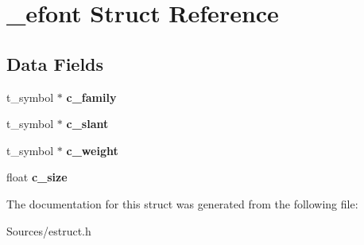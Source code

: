 \hypertarget{struct__efont}{\section{\-\_\-efont Struct Reference}
\label{struct__efont}
}
\subsection*{Data Fields}
\begin{DoxyCompactItemize}
\item 
\hypertarget{struct__efont_ad0a12c28988a03d63f0a63ae52545b7e}{t\-\_\-symbol $\ast$ {\bfseries c\-\_\-family}}\label{struct__efont_ad0a12c28988a03d63f0a63ae52545b7e}

\item 
\hypertarget{struct__efont_afe59dcb9bf09d16691d63350aba4e22f}{t\-\_\-symbol $\ast$ {\bfseries c\-\_\-slant}}\label{struct__efont_afe59dcb9bf09d16691d63350aba4e22f}

\item 
\hypertarget{struct__efont_a1e65976e3fc680a945be671bbcada87c}{t\-\_\-symbol $\ast$ {\bfseries c\-\_\-weight}}\label{struct__efont_a1e65976e3fc680a945be671bbcada87c}

\item 
\hypertarget{struct__efont_a0c2e0d8b2b562976f466b37e1804e896}{float {\bfseries c\-\_\-size}}\label{struct__efont_a0c2e0d8b2b562976f466b37e1804e896}

\end{DoxyCompactItemize}


The documentation for this struct was generated from the following file\-:\begin{DoxyCompactItemize}
\item 
Sources/estruct.\-h\end{DoxyCompactItemize}
